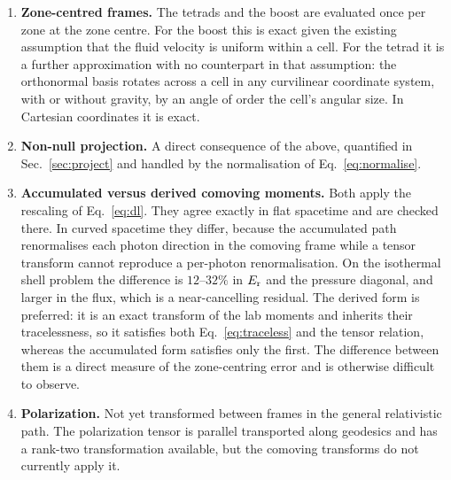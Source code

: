 \documentclass[11pt]{article}
\begin{document}
\begin{enumerate}
\item \textbf{Zone-centred frames.} The tetrads and the boost are evaluated once per zone
at the zone centre. For the boost this is exact given the existing assumption that the
fluid velocity is uniform within a cell. For the tetrad it is a further approximation with
no counterpart in that assumption: the orthonormal basis rotates across a cell in any
curvilinear coordinate system, with or without gravity, by an angle of order the cell's
angular size. In Cartesian coordinates it is exact.

\item \textbf{Non-null projection.} A direct consequence of the above, quantified in
Sec.~\ref{sec:project} and handled by the normalisation of Eq.~\eqref{eq:normalise}.

\item \textbf{Accumulated versus derived comoving moments.} Both apply the rescaling of
Eq.~\eqref{eq:dl}. They agree exactly in flat spacetime and are checked there. In curved spacetime they differ, because the accumulated
path renormalises each photon direction in the comoving frame while a tensor transform
cannot reproduce a per-photon renormalisation. On the isothermal shell problem the
difference is $12$--$32\%$ in $E_{\rm r}$ and the pressure diagonal, and larger in the
flux, which is a near-cancelling residual. The derived form is preferred: it is an exact
transform of the lab moments and inherits their tracelessness, so it satisfies both
Eq.~\eqref{eq:traceless} and the tensor relation, whereas the accumulated form satisfies
only the first. The difference between them is a direct measure of the zone-centring error
and is otherwise difficult to observe.

\item \textbf{Polarization.} Not yet transformed between frames in the general
relativistic path. The polarization tensor is parallel transported along geodesics and has
a rank-two transformation available, but the comoving transforms do not currently apply
it.
\end{enumerate}
\end{document}
